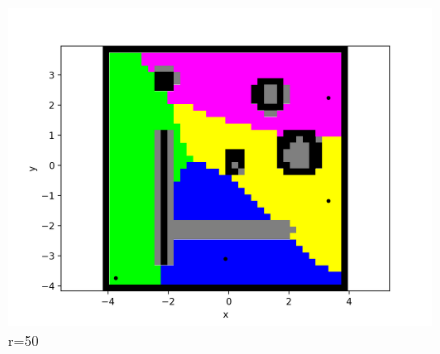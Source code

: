 \documentclass{beamer}
\begin{document}
\begin{frame}
\begin{figure}[H]
\begin{minipage}{0.3\textwidth}
				\includegraphics[width=\linewidth]{DARPImages/50}
				\caption{r=50}
			\end{minipage}
			
			\vspace*{1cm} %
			

\end{figure}
\end{frame}
\end{document}
